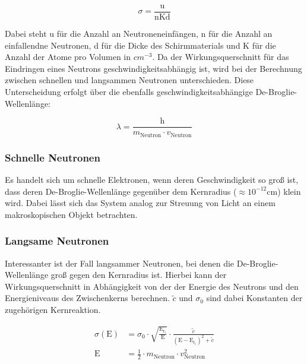 \documentclass[titlepage = firstcover]{scrartcl}
\begin{document}
            \begin{equation*}
                \sigma = \frac{\text{u}}{\text{nKd}}
            \end{equation*}

            \noindent
            Dabei steht u für die Anzahl an Neutroneneinfängen, n für die Anzahl an einfallendne Neutronen, d für die Dicke des Schirmmaterials und K für die Anzahl der Atome pro Volumen in $cm^{-3}$.
            Da der Wirkungsquerschnitt für das Eindringen eines Neutrons geschwindigkeitsabhängig ist, wird bei der Berechnung zwischen schnellen und langsammen Neutronen unterschieden. Diese 
            Unterscheidung erfolgt über die ebenfalls geschwindigkeitsabhängige De-Broglie-Wellenlänge:

            \begin{equation*}
                \lambda = \frac{\text{h}}{m_{\text{Neutron}} \cdot v_{\text{Neutron}}}
            \end{equation*}

            \noindent

            \subsubsection*{Schnelle Neutronen}
                Es handelt sich um schnelle Elektronen, wenn deren Geschwindigkeit so groß ist, dass deren De-Broglie-Wellenlänge gegenüber dem Kernradius ($\approx 10^{-12}$cm) klein wird. Dabei 
                lässt sich das System analog zur Streuung von Licht an einem makroskopischen Objekt betrachten.

            \subsubsection*{Langsame Neutronen}
                Interessanter ist der Fall langsammer Neutronen, bei denen die De-Broglie-Wellenlänge groß gegen den Kernradius ist. Hierbei kann der Wirkungsquerschnitt in Abhängigkeit von der 
                der Energie des Neutrons und den Energieniveaus des Zwischenkerns berechnen. $\widetilde{c}$ und $\sigma_0$ sind dabei Konstanten der zugehörigen Kernreaktion.

                \begin{align*}
                    \sigma(\text{E}) &= \sigma_0 \cdot \sqrt{\frac{\text{E}_{\text{r}_i}}{\text{E}}} \cdot \frac{\widetilde{c}}{\left(\text{E} - \text{E}_{\text{r}_i}\right)^2 + \widetilde{c}}\\
                    \text{E} &= \frac{1}{2} \cdot m_{\text{Neutron}} \cdot v_{\text{Neutron}}^2
                \end{align*}
\end{document}

